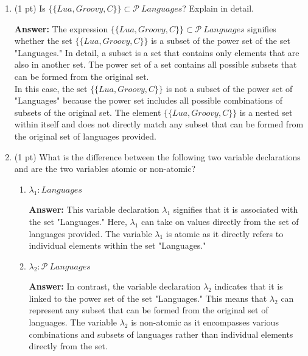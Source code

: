 \documentclass[12pt]{article}
\begin{document}
\begin{spacing}{1.5}
\begin{enumerate}
		\item (1 pt) Is $\{\{Lua, Groovy, C\}\} \subset \mathcal{P} \: Languages$? Explain in detail.
		      		      		      		      
		      \textbf{Answer:}  The expression $\{\{Lua, Groovy, C\}\} \subset \mathcal{P} \: Languages$ signifies whether the set $\{\{Lua, Groovy, C\}\}$ is a subset of the power set of the set "Languages." In detail, a subset is a set that contains only elements that are also in another set. The power set of a set contains all possible subsets that can be formed from the original set.\\
		      		      		      		                  
		      In this case, the set $\{\{Lua, Groovy, C\}\}$ is not a subset of the power set of "Languages" because the power set includes all possible combinations of subsets of the original set. The element $\{\{Lua, Groovy, C\}\}$ is a nested set within itself and does not directly match any subset that can be formed from the original set of languages provided.\\
		      		      		      		                  
		\item (1 pt) What is the difference between the following two variable declarations and are the two variables atomic or non-atomic?
		      		      		      		                  
		      \begin{enumerate}
		      	\item $\lambda_1 : Languages$
		      	      		      	      		      	      		      	      
		      	      \textbf{Answer:} This variable declaration $\lambda_1$ signifies that it is associated with the set "Languages." Here, $\lambda_1$ can take on values directly from the set of languages provided. The variable $\lambda_1$ is atomic as it directly refers to individual elements within the set "Languages."\\
		      	      		      	      		      	      		      	                  
		      	\item $\lambda_2 : \mathcal{P} \: Languages$
		      	      		      	      		      	      		      	          
		      	      \textbf{Answer:} In contrast, the variable declaration $\lambda_2$ indicates that it is linked to the power set of the set "Languages." This means that $\lambda_2$ can represent any subset that can be formed from the original set of languages. The variable $\lambda_2$ is non-atomic as it encompasses various combinations and subsets of languages rather than individual elements directly from the set.\\
		      	      		      	      		      	      		      	                  

\end{enumerate}
\end{enumerate}
\end{spacing}
\end{document}
